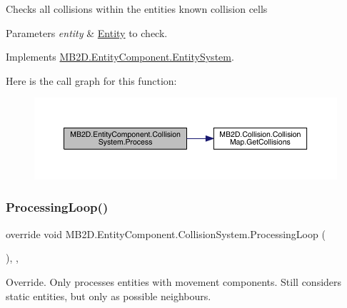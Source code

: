 Checks all collisions within the entities known collision cells 


\begin{DoxyParams}{Parameters}
{\em entity} & \hyperlink{class_m_b2_d_1_1_entity_component_1_1_entity}{Entity} to check.\\
\hline
\end{DoxyParams}


Implements \hyperlink{class_m_b2_d_1_1_entity_component_1_1_entity_system_abbf83b87cb5d12754fb058cef50451fa}{M\+B2\+D.\+Entity\+Component.\+Entity\+System}.

Here is the call graph for this function\+:\nopagebreak
\begin{figure}[H]
\begin{center}
\leavevmode
\includegraphics[width=350pt]{class_m_b2_d_1_1_entity_component_1_1_collision_system_adfbee070ed7b120565a5f8a08c159535_cgraph}
\end{center}
\end{figure}
\hypertarget{class_m_b2_d_1_1_entity_component_1_1_collision_system_a06249adc606475cdc35f28783a1b27c4}{}\label{class_m_b2_d_1_1_entity_component_1_1_collision_system_a06249adc606475cdc35f28783a1b27c4} 
\subsubsection{\texorpdfstring{Processing\+Loop()}{ProcessingLoop()}}
{\footnotesize\ttfamily override void M\+B2\+D.\+Entity\+Component.\+Collision\+System.\+Processing\+Loop (\begin{DoxyParamCaption}{ }\end{DoxyParamCaption})\hspace{0.3cm}{\ttfamily [inline]}, {\ttfamily [protected]}, {\ttfamily [virtual]}}



Override. Only processes entities with movement components. Still considers static entities, but only as possible neighbours. 



